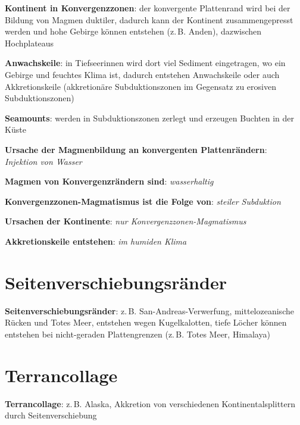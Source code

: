 \textbf{Kontinent in Konvergenzzonen}:
der konvergente Plattenrand wird bei der Bildung von Magmen duktiler,
dadurch kann der Kontinent zusammengepresst werden und hohe Gebirge können entstehen
(z.\,B. Anden), dazwischen Hochplateaus

\textbf{Anwachskeile}:
in Tiefseerinnen wird dort viel Sediment eingetragen, wo ein Gebirge und feuchtes Klima ist,
dadurch entstehen Anwachskeile oder auch Akkretionskeile
(akkretionäre Subduktionszonen im Gegensatz zu erosiven Subduktionszonen)

\textbf{Seamounts}:
werden in Subduktionszonen zerlegt und erzeugen Buchten in der Küste

\begin{wichtig}
    \item
    \textbf{Ursache der Magmenbildung an konvergenten Plattenrändern}:\\
    \emph{Injektion von Wasser}

    \item
    \textbf{Magmen von Konvergenzrändern sind}:
    \emph{wasserhaltig}

    \item
    \textbf{Konvergenzzonen-Magmatismus ist die Folge von}:
    \emph{steiler Subduktion}

    \item
    \textbf{Ursachen der Kontinente}:
    \emph{nur Konvergenzzonen-Magmatismus}

    \item
    \textbf{Akkretionskeile entstehen}:
    \emph{im humiden Klima}
\end{wichtig}

\section{%
    Seitenverschiebungsränder%
}

\textbf{Seitenverschiebungsränder}:
z.\,B. San-Andreas-Verwerfung, mittelozeanische Rücken und Totes Meer,
entstehen wegen Kugelkalotten,
tiefe Löcher können entstehen bei nicht-geraden Plattengrenzen
(z.\,B. Totes Meer, Himalaya)

\section{%
    Terrancollage%
}

\textbf{Terrancollage}:
z.\,B. Alaska,
Akkretion von verschiedenen Kontinentalsplittern durch Seitenverschiebung

